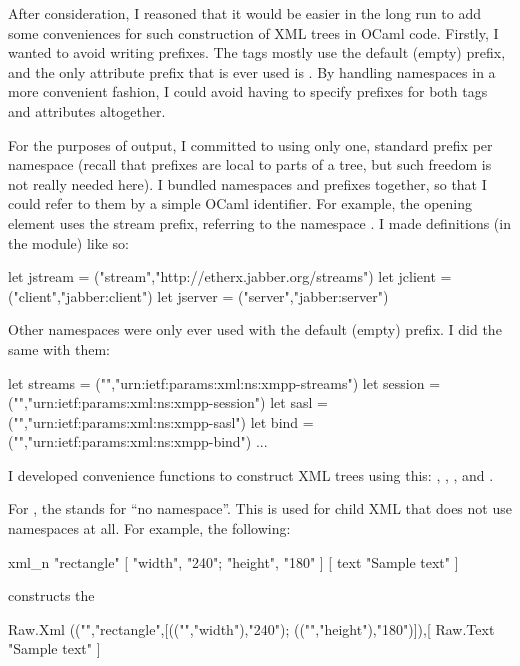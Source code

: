 After consideration, I reasoned that it would be easier in the long run to add some conveniences for such construction of XML trees in OCaml code. Firstly, I wanted to avoid writing prefixes. The tags mostly use the default (empty) prefix, and the only attribute prefix that is ever used is . By handling namespaces in a more convenient fashion, I could avoid having to specify prefixes for both tags and attributes altogether.

For the purposes of output, I committed to using only one, standard prefix per namespace (recall that prefixes are local to parts of a tree, but such freedom is not really needed here). I bundled namespaces and prefixes together, so that I could refer to them by a simple OCaml identifier. For example, the opening  element uses the stream prefix, referring to the namespace . I made definitions (in the  module) like so:

\begin{ocaml}
let jstream  = ("stream","http://etherx.jabber.org/streams")
let jclient  = ("client","jabber:client")
let jserver  = ("server","jabber:server")
\end{ocaml}

Other namespaces were only ever used with the default (empty) prefix. I did the same with them:

\begin{ocaml}
let streams = ("","urn:ietf:params:xml:ns:xmpp-streams")
let session = ("","urn:ietf:params:xml:ns:xmpp-session")
let sasl    = ("","urn:ietf:params:xml:ns:xmpp-sasl")
let bind    = ("","urn:ietf:params:xml:ns:xmpp-bind")
...
\end{ocaml}

I developed convenience functions to construct XML trees using this: , , , and .

For , the  stands for ``no namespace''. This is used for child XML that does not use namespaces at all. For example, the following:
\begin{ocaml}
xml_n "rectangle" [ "width", "240"; "height", "180" ] [
  text "Sample text"
]
\end{ocaml} constructs the 
\begin{ocaml}
Raw.Xml (("","rectangle",[(("","width"),"240"); (("","height"),"180")]),[
  Raw.Text "Sample text"
]
\end{ocaml}

